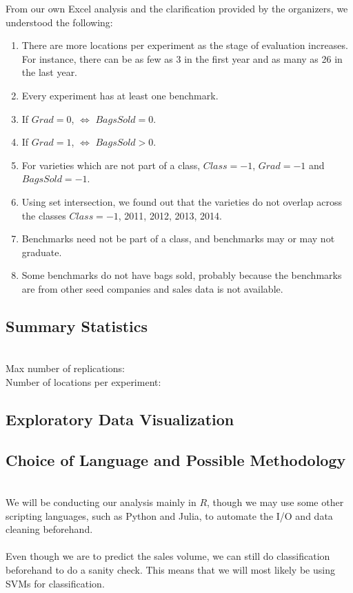 \documentclass[psamsfonts]{amsart}
\begin{document}
From our own Excel analysis and the clarification provided by the organizers, we understood the following:
\begin{enumerate}
\item There are more locations per experiment as the stage of evaluation increases. For instance, there can be as few as 3 in the first year and as many as 26 in the last year.
\item Every experiment has at least one benchmark.
\item If $Grad = 0$, $\iff$ $BagsSold = 0$. 
\item If $Grad = 1$, $\iff$ $BagsSold > 0$. 
\item For varieties which are not part of a class, $Class = -1$, $Grad = -1$ and $BagsSold = -1$.
\item Using set intersection, we found out that the varieties do not overlap across the classes $Class = -1$, 2011, 2012, 2013, 2014.
\item Benchmarks need not be part of a class, and benchmarks may or may not graduate.
\item Some benchmarks do not have bags sold, probably because the benchmarks are from other seed companies and sales data is not available.

\end{enumerate}

\subsection*{Summary Statistics}
\hfill\\
Max number of replications:\\
Number of locations per experiment:\\

\subsection*{Exploratory Data Visualization}
\subsection*{Choice of Language and Possible Methodology}
\hfill \\

 
We will be conducting our analysis mainly in $R$, though we may use some other scripting languages, such as Python and Julia, to automate the I/O and data cleaning beforehand.\\
\\
Even though we are to predict the sales volume, we can still do classification beforehand to do a sanity check. This means that we will most likely be using SVMs for classification.
\end{document}
